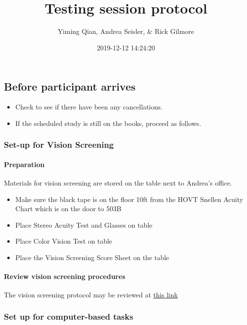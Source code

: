 \documentclass[]{article}
\title{Testing session protocol}
\author{Yiming Qian, Andrea Seisler, \& Rick Gilmore}
\date{2019-12-12 14:24:20}
\providecommand{\tightlist}{%
  \setlength{\itemsep}{0pt}\setlength{\parskip}{0pt}}
\let\oldparagraph\paragraph
\renewcommand{\paragraph}[1]{\oldparagraph{#1}\mbox{}}
\begin{document}
\maketitle

{
\setcounter{tocdepth}{3}
\tableofcontents
}
\subsection{Before participant
arrives}\label{before-participant-arrives}

\begin{itemize}
\tightlist
\item
  Check to see if there have been any cancellations.
\item
  If the scheduled study is still on the books, proceed as follows.
\end{itemize}

\subsubsection{Set-up for Vision
Screening}\label{set-up-for-vision-screening}

\paragraph{Preparation}\label{preparation}

Materials for vision screening are stored on the table next to Andrea's
office.

\begin{itemize}
\tightlist
\item
  Make sure the black tape is on the floor 10ft from the HOVT Snellen
  Acuity Chart which is on the door to 503B
\item
  Place Stereo Acuity Test and Glasses on table
\item
  Place Color Vision Test on table
\item
  Place the Vision Screening Score Sheet on the table
\end{itemize}

\paragraph{Review vision screening
procedures}\label{review-vision-screening-procedures}

The vision screening protocol may be reviewed at
\href{vision-screening-protocol.html}{this link}

\subsubsection{Set up for computer-based
tasks}\label{set-up-for-computer-based-tasks}
\end{document}
